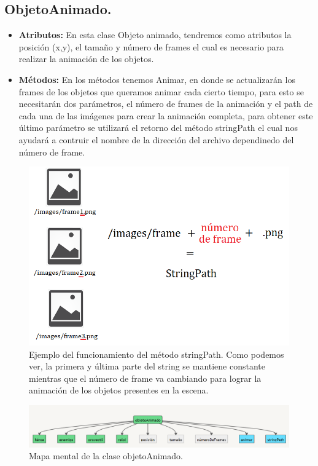 \documentclass{article}
\begin{document}
\subsection{ObjetoAnimado.}\label{objeto_animado}
\begin{itemize}
  \item \textbf{Atributos:} En esta clase Objeto animado, tendremos como atributos la posición (x,y), el tamaño y número de frames el cual es necesario para realizar la animación de los objetos.
  
  \item \textbf{Métodos:} En los métodos tenemos Animar, en donde se actualizarán los frames de los objetos que queramos animar cada cierto tiempo, para esto se necesitarán dos parámetros, el número de frames de la animación y el path de cada una de las imágenes para crear la animación completa, para obtener este último parámetro se utilizará el retorno del método stringPath el cual nos ayudará a contruir el nombre de la dirección del archivo dependinedo del número de frame.
\end{itemize}

\newpage
\begin{figure}[h]
\includegraphics[scale=0.6]{Images/string.png}
\centering
\caption{Ejemplo del funcionamiento del método stringPath. Como podemos ver, la primera y última parte del string se mantiene constante mientras que el número de frame va cambiando para lograr la animación de los objetos presentes en la escena.}
\label{fig:string}
\end{figure}

\begin{figure}[h]
\includegraphics[scale=0.5]{Images/ObjetoAnimado.png}
\centering
\caption{Mapa mental de la clase objetoAnimado.}
\label{fig:mmobjani}
\end{figure}
\end{document}
